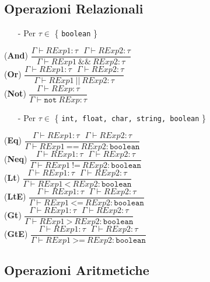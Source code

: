 \documentclass[12pt]{article}
\begin{document}
\subsection*{Operazioni Relazionali}
\begin{center}
\begin{itemize}
\item[-] Per $\tau \in$ \{ \texttt{boolean} \}
\end{itemize}
\noindent(\textbf{And})
$\dfrac{\Gamma \vdash RExp1:\tau\ \ \ \Gamma \vdash RExp2:\tau}{\Gamma \vdash RExp1\ \texttt{\&\&} \ RExp2:\tau}$\\[0.1in]
\noindent(\textbf{Or})
$\dfrac{\Gamma \vdash RExp1:\tau\ \ \ \Gamma \vdash RExp2:\tau}{\Gamma \vdash RExp1\ \texttt{||} \ RExp2:\tau}$\\[0.1in]
\noindent(\textbf{Not})
$\dfrac{\Gamma \vdash RExp:\tau}{\Gamma \vdash \texttt{not}\  RExp:\tau}$\\[0.1in]

\begin{itemize}
\item[-] Per $\tau \in$ \{ \texttt{int, float, char, string, boolean} \}
\end{itemize}
\noindent(\textbf{Eq})
$\dfrac{\Gamma \vdash RExp1:\tau\ \ \ \Gamma \vdash RExp2:\tau}{\Gamma \vdash RExp1\ \texttt{==}\ RExp2:\texttt{boolean}}$\\[0.1in]
\noindent(\textbf{Neq})
$\dfrac{\Gamma \vdash RExp1:\tau\ \ \ \Gamma \vdash RExp2:\tau}{\Gamma \vdash RExp1\ \texttt{!=}\ RExp2:\texttt{boolean}}$\\[0.1in]
\noindent(\textbf{Lt})
$\dfrac{\Gamma \vdash RExp1:\tau\ \ \ \Gamma \vdash RExp2:\tau}{\Gamma \vdash RExp1\ \texttt{<}\ RExp2:\texttt{boolean}}$\\[0.1in]
\noindent(\textbf{LtE})
$\dfrac{\Gamma \vdash RExp1:\tau\ \ \ \Gamma \vdash RExp2:\tau}{\Gamma \vdash RExp1\ \texttt{<=}\ RExp2:\texttt{boolean}}$\\[0.1in]
\noindent(\textbf{Gt})
$\dfrac{\Gamma \vdash RExp1:\tau\ \ \ \Gamma \vdash RExp2:\tau}{\Gamma \vdash RExp1\ \texttt{>}\ RExp2:\texttt{boolean}}$\\[0.1in]
\noindent(\textbf{GtE})
$\dfrac{\Gamma \vdash RExp1:\tau\ \ \ \Gamma \vdash RExp2:\tau}{\Gamma \vdash RExp1\ \texttt{>=}\ RExp2:\texttt{boolean}}$\\[0.1in]
\end{center}

\subsection*{Operazioni Aritmetiche}
\end{document}
